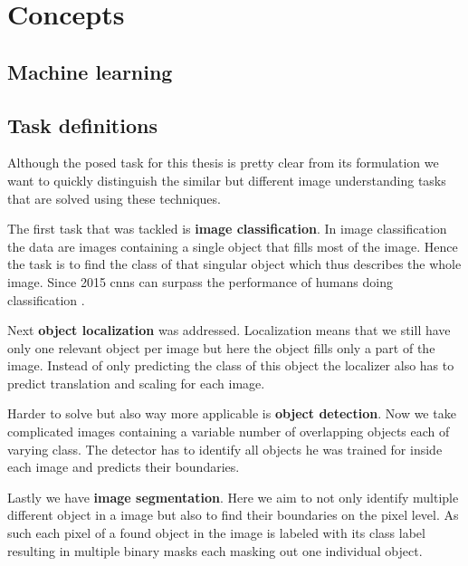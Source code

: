 %
\chapter{Concepts}
\label{sec:concepts}


\section{Machine learning}
\label{sec:concepts:ml}

\section{Task definitions}
\label{sec:concepts:tasks}
Although the posed task for this thesis is pretty clear from its formulation we want to quickly distinguish the similar but different image understanding tasks that are solved using these techniques.

The first task that was tackled is \textbf{image classification}. In image classification the data are images containing a single object that fills most of the image. Hence the task is to find the class of that singular object which thus describes the whole image. Since 2015 \glspl{cnn} can surpass the performance of humans doing classification \citep{he_delving_2015}.

Next \textbf{object localization} was addressed. Localization means that we still have only one relevant object per image but here the object fills only a part of the image. Instead of only predicting the class of this object the localizer also has to predict translation and scaling for each image.

Harder to solve but also way more applicable is \textbf{object detection}. Now we take complicated images containing a variable number of overlapping objects each of varying class. The detector has to identify all objects he was trained for inside each image and predicts their boundaries.

Lastly we have \textbf{image segmentation}. Here we aim to not only identify multiple different object in a image but also to find their boundaries on the pixel level. As such each pixel of a found object in the image is labeled with its class label resulting in multiple binary masks each masking out one individual object.

